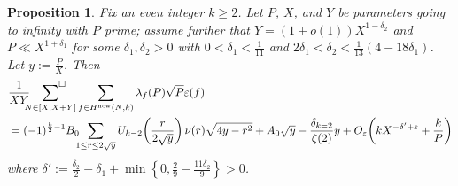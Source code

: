 \documentclass[12pt,letterpaper,reqno]{amsart}
\theoremstyle{plain}
\newtheorem{proposition}[theorem]{Proposition}
\theoremstyle{definition}
\numberwithin{equation}{section}
\numberwithin{figure}{section}
\numberwithin{table}{section}
\newcommand{\lrp}[1]{\!\left(#1\right)}
\newcommand{\lrcb}[1]{\!\left\{#1\right\}}
\newcommand{\new}{{\rm new}}
\begin{document}
\begin{proposition} \label{prop:pre-main-result}
Fix an even integer $k\ge 2$. Let $P$, $X$, and $Y$ be parameters going to infinity with $P$ prime; assume further that $Y=(1+o(1))X^{1-\delta_2}$ and $P\ll X^{1+\delta_1}$ for some $\delta_1,\delta_2>0$ with $0<\delta_1<\frac{1}{11}$ and $2\delta_1<\delta_2<\frac{1}{13}(4-18\delta_1)$. Let $y:= \frac{P}{X}$. Then 
\begin{align}
    &\frac{1}{XY} \sideset{}{^\square} \sum_{N \in [X, X+Y]} \sum_{f \in H^\new(N,k)} \lambda_f(P)\sqrt{P}\varepsilon(f) \\
    &= (-1)^{\frac{k}{2}-1} B_0\!\!\!\sum_{1 \le r \le 2\sqrt{y}}   U_{k-2}\lrp{\frac{r}{2\sqrt{y}}}\nu(r)\sqrt{4y-r^2} 
    + A_0\sqrt{y} - \frac{\delta_{k=2}}{\zeta(2)} y  + O_\varepsilon\lrp{kX^{-\delta'+\varepsilon}+\frac{k}{P}}
\end{align}
where 
$
    \delta' := \frac{\delta_2}{2} - \delta_1 +\min\lrcb{0,\frac{2}{9}-\frac{11\delta_2}{9}} > 0
$.
\end{proposition}
\end{document}
